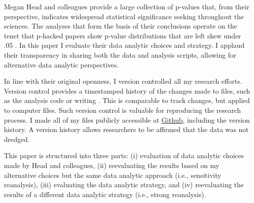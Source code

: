 Megan Head and colleagues provide a large collection of p-values that, from their perspective, indicates widespread statistical significance seeking throughout the sciences. The analyses that form the basis of their conclusions operate on the tenet that p-hacked papers show p-value distributions that are left skew under .05 \cite{Simonsohn2014}. In this paper I evaluate their data analytic choices and strategy. I applaud their transparency in sharing both the data and analysis scripts, allowing for alternative data analytic perspectives.

In line with their original openness, I version controlled all my research efforts. Version control provides a timestamped history of the changes made to files, such as the analysis code or writing \cite{Ram2013}. This is comparable to track changes, but applied to computer files. Such version control is valuable for reproducing the research process. I made all of my files publicly accessible at \href{https://github.com/chartgerink/2015head}{Github}, including the version history. A version history allows researchers to be affirmed that the data was not dredged.

This paper is structured into three parts: (i) evaluation of data analytic choices made by Head and colleagues, (ii) reevaluating the results based on my alternative choices but the same data analytic approach (i.e., sensitivity reanalysis), (iii) evaluating the data analytic strategy, and (iv) reevaluating the results of a different data analytic strategy (i.e., strong reanalysis). 